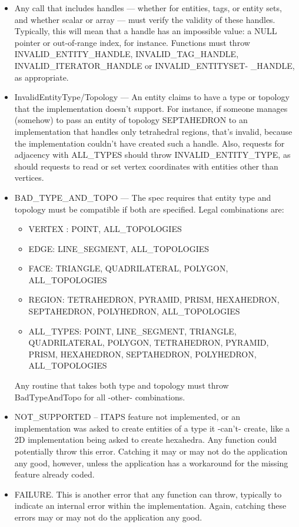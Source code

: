 \documentclass{article}
\begin{document}
\begin{itemize}
\item Any call that includes handles --- whether for entities, tags, 
or entity sets, and whether scalar or array --- must verify the 
validity of these handles. Typically, this will mean that a handle 
has an impossible value: a NULL pointer or out-of-range index, 
for instance. Functions must throw INVALID\_ENTITY\_HANDLE, INVALID\_TAG\_HANDLE, 
INVALID\_ITERATOR\_HANDLE or INVALID\_ENTITYSET- \_HANDLE, as appropriate.


\item InvalidEntityType/Topology --- An entity claims to have a type 
or topology that the implementation doesn't support. For instance, 
if someone manages (somehow) to pass an entity of topology SEPTAHEDRON 
to an implementation that handles only tetrahedral regions, that's 
invalid, because the implementation couldn't have created such 
a handle. Also, requests for adjacency with ALL\_TYPES should 
throw INVALID\_ENTITY\_TYPE, as should requests to read or set 
vertex coordinates with entities other than vertices.


\item BAD\_TYPE\_AND\_TOPO --- The spec requires that entity type and 
topology must be compatible if both are specified. Legal 
combinations are:
  \begin{itemize}
  \item VERTEX : POINT, ALL\_TOPOLOGIES
  \item EDGE: LINE\_SEGMENT, ALL\_TOPOLOGIES
  \item FACE: TRIANGLE, QUADRILATERAL, POLYGON, ALL\_TOPOLOGIES
  \item REGION: TETRAHEDRON, PYRAMID, PRISM, HEXAHEDRON, SEPTAHEDRON, POLYHEDRON, ALL\_TOPOLOGIES
  \item ALL\_TYPES: POINT, LINE\_SEGMENT, TRIANGLE, QUADRILATERAL, 
POLYGON, TETRAHEDRON, PYRAMID, PRISM, HEXAHEDRON, SEPTAHEDRON, 
POLYHEDRON, ALL\_TOPOLOGIES
  \end{itemize}


Any routine that takes both type and topology must throw BadTypeAndTopo 
for all -other- combinations.


\item NOT\_SUPPORTED -- ITAPS feature not implemented, or an implementation 
was asked to create entities of a type it -can't- create, like 
a 2D implementation being asked to create hexahedra. Any 
function could potentially throw this error. Catching it may 
or may not do the application any good, however, unless the application 
has a workaround for the missing feature already coded.


\item
FAILURE. This is another error that any function can throw, typically 
to indicate an internal error within the implementation. Again, 
catching these errors may or may not do the application any good.
\end{itemize}
\end{document}
